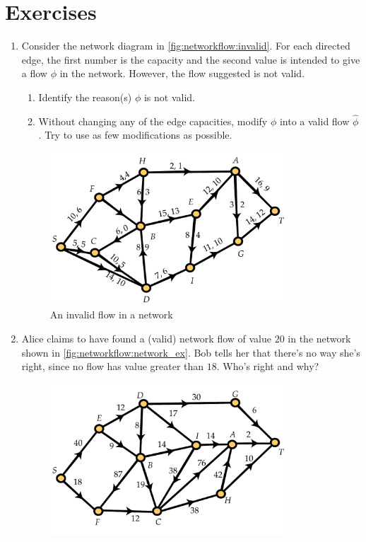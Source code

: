 \section{Exercises}\label{s:networkflow:exercises}

\begin{enumerate}
\item Consider the network diagram in
  \autoref{fig:networkflow:invalid}. For each directed edge, the first
  number is the capacity and the second value is intended to give a
  flow $\phi$ in the network. However, the flow suggested is not
  valid.
  \begin{enumerate}
  \item Identify the reason(s) $\phi$ is not valid.
  \item Without changing any of the edge capacities, modify $\phi$
    into a valid flow $\widehat{\phi}$. Try to use as few modifications as
    possible.
  \end{enumerate}
  \begin{figure}
    \centering
    \includegraphics[width=3.5in]{networkflow-figs/networkflow_ex_invalid}
    \caption{An invalid flow in a network}
    \label{fig:networkflow:invalid}
  \end{figure}
\item Alice claims to have found a (valid) network flow of value $20$
  in the network shown in \autoref{fig:networkflow:network_ex}. Bob
  tells her that there's no way she's right, since no flow has value
  greater than $18$. Who's right and why?
  \begin{figure}
    \centering
    \includegraphics[width=3.5in]{networkflow-figs/network_ex}

\end{figure}
\end{enumerate}
